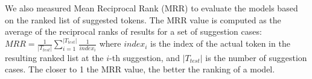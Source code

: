 






\vspace{0.03in}
 We also
measured Mean Reciprocal Rank (MRR) to evaluate the models based on the
ranked list of suggested tokens.
%
The MRR value is computed as the average of the reciprocal ranks of
results for a set of suggestion cases:
\indent $MRR = \frac{1}{{|{T_{test}}|}}\sum\limits_{i = 1}^{|{T_{test}}|} {\frac{1}{{index_i}}} $
where $index_i$ is the index of the actual token in the
resulting ranked list at the $i$-th suggestion, and $|T_{test}|$ is
the number of suggestion cases.
%
The closer to 1 the MRR value, the better the ranking of a model. 

